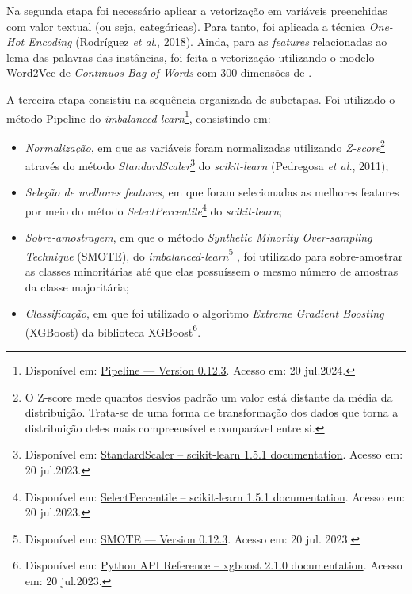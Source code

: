 Na segunda etapa foi necessário aplicar a vetorização em variáveis
preenchidas com valor textual (ou seja, categóricas). Para tanto, foi
aplicada a técnica \emph{One-Hot Encoding} (Rodríguez \emph{et al}.,
2018). Ainda, para as \emph{features} relacionadas ao lema das palavras
das instâncias, foi feita a vetorização utilizando o modelo Word2Vec de
\emph{Continuos Bag-of-Words} com 300 dimensões de \textcite{hartmann2017}.

A terceira etapa consistiu na sequência organizada de subetapas. Foi
utilizado o método Pipeline do \emph{imbalanced-learn}\footnote{Disponível
  em:
  \href{https://imbalanced-learn.org/stable/references/generated/imblearn.pipeline.Pipeline.html}{Pipeline
  --- Version 0.12.3}. Acesso em: 20 jul.2024.}, consistindo em:

\begin{itemize}
\item \emph{Normalização}, em que as variáveis foram normalizadas utilizando
  \emph{Z-score}\footnote{O Z-score mede quantos desvios padrão um valor
    está distante da média da distribuição. Trata-se de uma forma de
    transformação dos dados que torna a distribuição deles mais
    compreensível e comparável entre si.} através do método
  \emph{StandardScaler}\footnote{Disponível em: \href{https://scikit-learn.org/stable/modules/generated/sklearn.preprocessing.StandardScaler.html}{StandardScaler
    -- scikit-learn 1.5.1 documentation}. Acesso em: 20 jul.2023.} do
  \emph{scikit-learn} (Pedregosa \emph{et al.}, 2011);
\item \emph{Seleção de melhores features}, em que foram selecionadas as
  melhores features por meio do método
  \emph{SelectPercentile}\footnote{Disponível em:
    \href{https://scikit-learn.org/stable/modules/generated/sklearn.feature_selection.SelectPercentile.html}{SelectPercentile
    -- scikit-learn 1.5.1 documentation}. Acesso em: 20 jul.2023.} do
  \emph{scikit-learn};
\item \emph{Sobre-amostragem}, em que o método \emph{Synthetic Minority
  Over-sampling Technique} (SMOTE), do
  \emph{imbalanced-learn}\footnote{Disponível em:
    \href{https://imbalanced-learn.org/stable/references/generated/imblearn.over_sampling.SMOTE.html}{SMOTE
    --- Version 0.12.3}. Acesso em: 20 jul. 2023.} \cite{lemaitre2017}, foi utilizado para sobre-amostrar as
  classes minoritárias até que elas possuíssem o mesmo número de
  amostras da classe majoritária;
\item \emph{Classificação}, em que foi utilizado o algoritmo \emph{Extreme
  Gradient Boosting} (XGBoost) \cite{chen2016} da biblioteca
  XGBoost\footnote{Disponível em:
    \href{https://xgboost.readthedocs.io/en/stable/python/python_api.html\#xgboost.XGBClassifier}{Python
    API Reference -- xgboost 2.1.0 documentation}. Acesso em: 20
    jul.2023.}.
\end{itemize}

